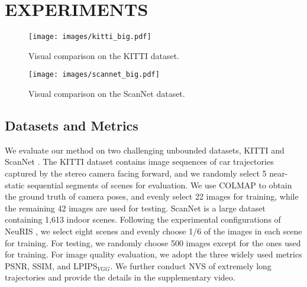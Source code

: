 \documentclass[letterpaper, 10 pt, conference]{ieeeconf}  %
\begin{document}
\section{EXPERIMENTS}

\begin{figure}[t]
  \centering
  \texttt{[image: images/kitti\_big.pdf]}
  \caption{Visual comparison on the KITTI dataset.}
  \label{fig:kitti}
\end{figure}

\begin{figure}[t]
  \centering
  \texttt{[image: images/scannet\_big.pdf]}
  \caption{Visual comparison on the ScanNet dataset.}
  \label{fig:scannet}
\end{figure}

\subsection{Datasets and Metrics}

We evaluate our method on two challenging unbounded datasets, KITTI \cite{geiger2012we} and ScanNet \cite{dai2017scannet}. The KITTI dataset contains image sequences of car trajectories captured by the stereo camera facing forward, and we randomly select 5 near-static sequential segments of scenes for evaluation. We use COLMAP \cite{schonberger2016structure} to obtain the ground truth of camera poses, and evenly select 22 images for training, while the remaining 42 images are used for testing. ScanNet is a large dataset containing 1,613 indoor scenes. Following the experimental configurations of NeuRIS \cite{wang2022neuris}, we select eight scenes and evenly choose 1/6 of the images in each scene for training. For testing, we randomly choose 500 images except for the ones used for training. For image quality evaluation, we adopt the three widely used metrics PSNR, SSIM\cite{wang2004image}, and LPIPS$_{VGG}$\cite{zhang2018unreasonable}. We further conduct NVS of extremely long trajectories and provide the details in the supplementary video.
\end{document}

